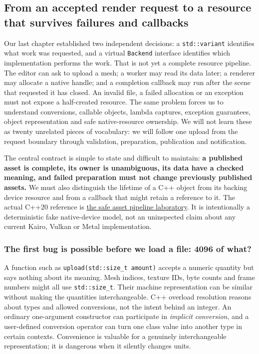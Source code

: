 \subsection{From an accepted render request to a resource that survives failures and callbacks}\label{from-an-accepted-render-request-to-a-resource-that-survives-failures-and-callbacks}

Our last chapter established two independent decisions: a \texttt{std::variant} identifies what work was requested, and a virtual \texttt{Backend} interface identifies which implementation performs the work. That is not yet a complete resource pipeline. The editor can ask to upload a mesh; a worker may read its data later; a renderer may allocate a native handle; and a completion callback may run after the scene that requested it has closed. An invalid file, a failed allocation or an exception must not expose a half-created resource. The same problem forces us to understand conversions, callable objects, lambda captures, exception guarantees, object representation and safe native-resource ownership. We will not learn these as twenty unrelated pieces of vocabulary: we will follow one upload from the request boundary through validation, preparation, publication and notification.

The central contract is simple to state and difficult to maintain: \textbf{a published asset is complete, its owner is unambiguous, its data have a checked meaning, and failed preparation must not change previously published assets.} We must also distinguish the lifetime of a C++ object from its backing device resource and from a callback that might retain a reference to it. The actual C++20 reference is \href{tools/labs/safe_asset_pipeline_lab.cpp}{the safe asset pipeline laboratory}. It is intentionally a deterministic fake native-device model, not an uninspected claim about any current Kairo, Vulkan or Metal implementation.

\subsubsection{The first bug is possible before we load a file: 4096 of what?}\label{the-first-bug-is-possible-before-we-load-a-file-4096-of-what}

A function such as \texttt{upload(std::size\_t\ amount)} accepts a numeric quantity but says nothing about its meaning. Mesh indices, texture IDs, byte counts and frame numbers might all use \texttt{std::size\_t}. Their machine representation can be similar without making the quantities interchangeable. C++ overload resolution reasons about types and allowed conversions, not the intent behind an integer. An ordinary one-argument constructor can participate in \emph{implicit conversion}, and a user-defined conversion operator can turn one class value into another type in certain contexts. Convenience is valuable for a genuinely interchangeable representation; it is dangerous when it silently changes units.


